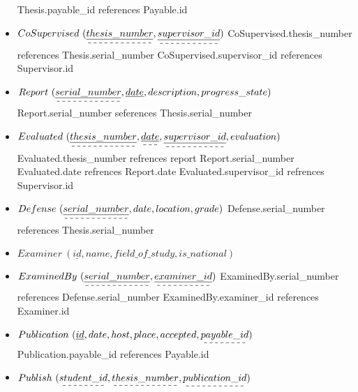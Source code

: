 \documentclass[a4paper]{article}
\begin{document}
\begin{itemize}
    \newline Thesis.payable\_id references Payable.id
    \newline
\item$CoSupervised \ (\dashuline{\underline{thesis\_number}}, \dashuline{\underline{supervisor\_id}})$
    \newline CoSupervised.thesis\_number references Thesis.serial\_number
    \newline CoSupervised.supervisor\_id references Supervisor.id 
\newline        
\item$ Report \ (\dashuline{\underline{serial\_number}}, \underline{date}, description, progress\_state)$
    \newline Report.serial\_number seferences Thesis.serial\_number
\newline    
\item$Evaluated \ (\dashuline{\underline{thesis\_number}}, \dashuline{\underline{date}}, \dashuline{\underline{supervisor\_id}}, evaluation)$
    \newline Evaluated.thesis\_number refrences report Report.serial\_number
    \newline Evaluated.date refrences Report.date
    \newline Evaluated.supervisor\_id refrences Supervisor.id 
\newline    
\item$Defense \ (\dashuline{\underline{serial\_number}}, date , location , grade )$
    \newline Defense.serial\_number references Thesis.serial\_number
   \newline
\item$Examiner \ (\underline{id}, name , field\_of\_study , is\_national)$
\newline
\item$ ExaminedBy \ (\dashuline{\underline{serial\_number}}, \dashuline{\underline{examiner\_id}})$
    \newline ExaminedBy.serial\_number references Defense.serial\_number
    \newline ExaminedBy.examiner\_id references Examiner.id
\newline
\item$ Publication \ (\underline{id}, date, host, place, accepted, \dashuline{payable\_id})$
    \newline Publication.payable\_id references Payable.id 
\newline  
\item$ Publish \ (\dashuline{student\_id}, \dashuline{thesis\_number}, \dashuline{publication\_id})$  

\end{itemize}
\end{document}
